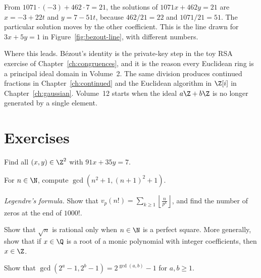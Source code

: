 \begin{examplex}
From $1071\cdot(-3)+462\cdot 7=21$, the solutions of $1071x+462y=21$ are $x=-3+22t$ and $y=7-51t$, because $462/21=22$ and $1071/21=51$. The particular solution moves by the other coefficient. This is the line drawn for $3x+5y=1$ in Figure~\ref{fig:bezout-line}, with different numbers.
\end{examplex}

\begin{beauty}
Where this leads. Bézout's identity is the private-key step in the toy RSA exercise of Chapter~\ref{ch:congruences}, and it is the reason every Euclidean ring is a principal ideal domain in Volume~2. The same division produces continued fractions in Chapter~\ref{ch:continued} and the Euclidean algorithm in $\Z[i]$ in Chapter~\ref{ch:gaussian}. Volume~12 starts when the ideal $a\Z+b\Z$ is no longer generated by a single element.
\end{beauty}

\section{Exercises}

\begin{exercise}[$\star$]\label{ex:bez}
Find all $(x,y)\in\Z^2$ with $91x+35y=7$.
\end{exercise}

\begin{exercise}[$\star$]\label{ex:gcdn}
For $n\in\N$, compute $\gcd\left(n^2+1,(n+1)^2+1\right)$.
\end{exercise}

\begin{exercise}[$\star$]\label{ex:zeros}
\emph{Legendre's formula.} Show that $v_p(n!)=\sum_{k\ge1}\left\lfloor\frac n{p^k}\right\rfloor$, and find the number of zeros at the end of $1000!$.
\end{exercise}

\begin{exercise}[$\star\star$]\label{ex:sqrt}
Show that $\sqrt n$ is rational only when $n\in\N$ is a perfect square. More generally, show that if $x\in\Q$ is a root of a monic polynomial with integer coefficients, then $x\in\Z$.
\end{exercise}

\begin{exercise}[$\star\star$]\label{ex:mersgcd}
Show that $\gcd\left(2^a-1,2^b-1\right)=2^{\gcd(a,b)}-1$ for $a,b\ge1$.
\end{exercise}

